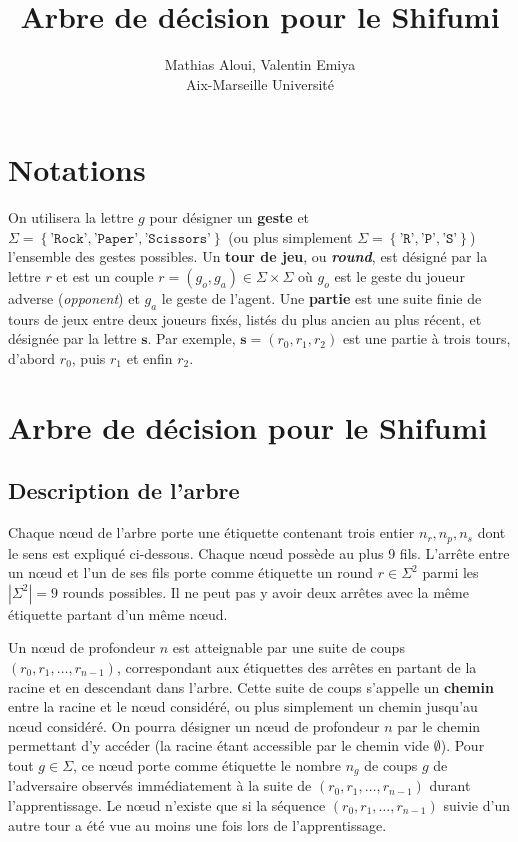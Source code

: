\documentclass[10pt,a4paper]{article}
\author{Mathias Aloui, Valentin Emiya\\Aix-Marseille Université}
\title{Arbre de décision pour le Shifumi}
\theoremstyle{plain} %
\theoremstyle{definition} %
\theoremstyle{remark} %
\def\noeud{n\oe ud\xspace}
\begin{document}
\maketitle
\tableofcontents

\section{Notations}
On utilisera la lettre $g$ pour désigner un \textbf{geste} et $\Sigma=\left \lbrace \texttt{'Rock'}, \texttt{'Paper'}, \texttt{'Scissors'}\right \rbrace$ (ou plus simplement $\Sigma=\left \lbrace \texttt{'R'}, \texttt{'P'}, \texttt{'S'}\right \rbrace$) l'ensemble des gestes possibles.
Un \textbf{tour de jeu}, ou \textit{\textbf{round}}, est désigné par la lettre $r$ et est un couple $r=\left (g_o, g_a\right )\in\Sigma\times\Sigma$ où $g_o$ est le geste du joueur adverse (\textit{opponent}) et $g_a$ le geste de l'agent.
Une \textbf{partie} est une suite finie de tours de jeux entre deux joueurs fixés, listés du plus ancien au plus récent, et désignée par la lettre $\textbf{s}$.
Par exemple, $\textbf{s}=\left (r_0, r_1, r_2\right )$ est une partie à trois tours, d'abord $r_0$, puis $r_1$ et enfin $r_2$.

\section{Arbre de décision pour le Shifumi}
\subsection{Description de l'arbre}
Chaque \noeud de l'arbre porte une étiquette contenant trois entier $n_r, n_p, n_s$ dont le sens est expliqué ci-dessous.
Chaque \noeud possède au plus 9 fils.
L'arrête entre un \noeud et l'un de ses fils porte comme étiquette un round $r\in\Sigma^2$ parmi les $\left |\Sigma^2\right | = 9$ rounds possibles.
Il ne peut pas y avoir deux arrêtes avec la même étiquette partant d'un même \noeud.

Un \noeud de profondeur $n$ est atteignable par une suite de coups $(r_0, r_1, \ldots, r_{n-1})$, correspondant aux étiquettes des arrêtes en partant de la racine et en descendant dans l'arbre.
Cette suite de coups s'appelle un \textbf{chemin} entre la racine et le \noeud considéré, ou plus simplement un chemin jusqu'au \noeud considéré.
On pourra désigner un \noeud de profondeur $n$ par le chemin permettant d'y accéder (la racine étant accessible par le chemin vide $\emptyset$).
Pour tout $g\in\Sigma$, ce \noeud porte comme étiquette le nombre $n_g$ de coups $g$ de l'adversaire observés immédiatement à la suite de $(r_0, r_1, \ldots, r_{n-1})$ durant l'apprentissage.
Le \noeud n'existe que si la séquence $(r_0, r_1, \ldots, r_{n-1})$ suivie d'un autre tour a été vue au moins une fois lors de l'apprentissage.
\end{document}
